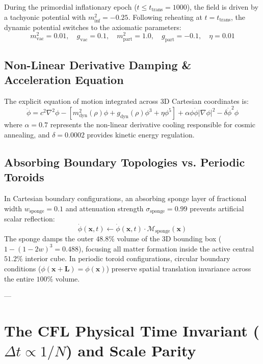 \documentclass[11pt, twoside]{article}
\begin{document}
During the primordial inflationary epoch ($t \le t_{\text{trans}} = 1000$), the field is driven by a tachyonic potential with $m_{\text{inf}}^2 = -0.25$. Following reheating at $t = t_{\text{trans}}$, the dynamic potential switches to the axiomatic parameters:
\begin{equation}
m_{\text{vac}}^2 = 0.01, \quad g_{\text{vac}} = 0.1, \quad m_{\text{part}}^2 = 1.0, \quad g_{\text{part}} = -0.1, \quad \eta = 0.01
\end{equation}

\subsection{Non-Linear Derivative Damping \& Acceleration Equation}
The explicit equation of motion integrated across 3D Cartesian coordinates is:
\begin{equation}
\label{eq:pde}
\ddot{\phi} = c^2 \nabla^2 \phi - \left[ m_{\text{dyn}}^2(\rho)\phi + g_{\text{dyn}}(\rho)\phi^3 + \eta \phi^5 \right] + \alpha \phi \dot{\phi} |\nabla \phi|^2 - \delta \dot{\phi}^2 \phi
\end{equation}
where $\alpha = 0.7$ represents the non-linear derivative cooling responsible for cosmic annealing, and $\delta = 0.0002$ provides kinetic energy regulation.

\subsection{Absorbing Boundary Topologies vs. Periodic Toroids}
In Cartesian boundary configurations, an absorbing sponge layer of fractional width $w_{\text{sponge}} = 0.1$ and attenuation strength $\sigma_{\text{sponge}} = 0.99$ prevents artificial scalar reflection:
\begin{equation}
\dot{\phi}(\mathbf{x}, t) \leftarrow \dot{\phi}(\mathbf{x}, t) \cdot \mathcal{M}_{\text{sponge}}(\mathbf{x})
\end{equation}
The sponge damps the outer $48.8\%$ volume of the 3D bounding box ($1 - (1 - 2w)^3 = 0.488$), focusing all matter formation inside the active central $51.2\%$ interior cube. In periodic toroid configurations, circular boundary conditions ($\phi(\mathbf{x} + \mathbf{L}) = \phi(\mathbf{x})$) preserve spatial translation invariance across the entire $100\%$ volume.

---

\section{The CFL Physical Time Invariant ($\Delta t \propto 1/N$) and Scale Parity}
\end{document}
